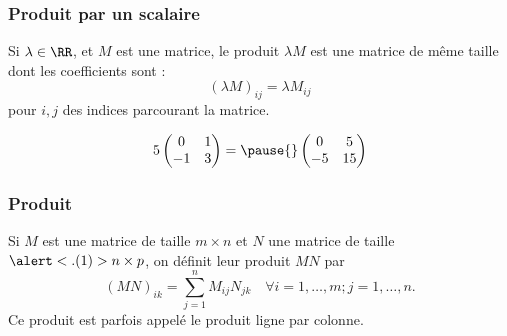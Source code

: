 \subsubsection{Produit par un scalaire}
\begin{frame}
  \begin{definition}
    Si \(\lambda \in \RR\), et \(M\) est une matrice, le produit \(\lambda M\) est\pause{} une matrice de même taille\pause{} dont les coefficients sont :
    \begin{equation*}
      {(\lambda M)}_{ij} = \lambda M_{ij}
    \end{equation*}
    pour \(i,j\) des indices parcourant la matrice.
  \end{definition}\pause{}
  \begin{example}
    \begin{equation*}
    5
    \begin{pmatrix}
      0 & 1\\
      -1 & 3
    \end{pmatrix}
    =\pause{}
    \begin{pmatrix}
      0&5\\-5&15
    \end{pmatrix}
  \end{equation*}
  \end{example}
\end{frame}
\subsubsection{Produit}
\begin{frame}
  \begin{definition}\label{def:produitmatriciel}
    Si \(M\) est une matrice de taille \(m\times n\) et \(N\) une matrice de taille \(\alert<.(1)>{n} \times p\),\pause{} on définit leur produit \(MN\) par\pause{}
    \begin{equation*}
      (MN)_{ik} = \sum_{j=1}^{n} M_{ij} N_{jk} \quad \forall i = 1, \ldots, m ; j = 1, \ldots, n.
    \end{equation*}
    Ce produit est parfois appelé le produit \og ligne par colonne\fg{}.
  \end{definition}
\end{frame}  

